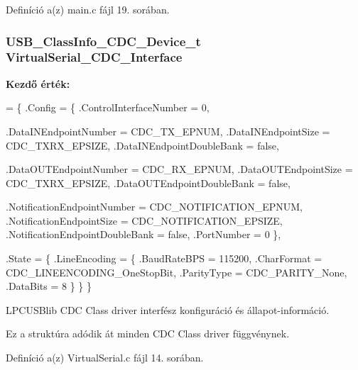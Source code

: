 Definíció a(z) main.\-c fájl 19. sorában.

\subsubsection[{Virtual\-Serial\-\_\-\-C\-D\-C\-\_\-\-Interface}]{\setlength{\rightskip}{0pt plus 5cm}U\-S\-B\-\_\-\-Class\-Info\-\_\-\-C\-D\-C\-\_\-\-Device\-\_\-t Virtual\-Serial\-\_\-\-C\-D\-C\-\_\-\-Interface}\label{_virtual_serial_8c_a6abff48bf476b7a0b5d81012d90058a6}
{\bfseries Kezdő érték\-:}
\begin{DoxyCode}
= \{
    .Config = \{
        .ControlInterfaceNumber         = 0,

        .DataINEndpointNumber           = CDC\_TX\_EPNUM,
        .DataINEndpointSize             = CDC\_TXRX\_EPSIZE,
        .DataINEndpointDoubleBank       = \textcolor{keyword}{false},

        .DataOUTEndpointNumber          = CDC\_RX\_EPNUM,
        .DataOUTEndpointSize            = CDC\_TXRX\_EPSIZE,
        .DataOUTEndpointDoubleBank      = \textcolor{keyword}{false},

        .NotificationEndpointNumber     = CDC\_NOTIFICATION\_EPNUM,
        .NotificationEndpointSize       = CDC\_NOTIFICATION\_EPSIZE,
        .NotificationEndpointDoubleBank = \textcolor{keyword}{false},
        .PortNumber                     = 0
    \},

    .State = \{
        .LineEncoding = \{
                .BaudRateBPS            = 115200,
                .CharFormat             = CDC\_LINEENCODING\_OneStopBit,
                .ParityType             = CDC\_PARITY\_None,
                .DataBits               = 8
        \}
    \}
\}
\end{DoxyCode}


L\-P\-C\-U\-S\-Blib C\-D\-C Class driver interfész konfiguráció és állapot-\/információ. 

Ez a struktúra adódik át minden C\-D\-C Class driver függvénynek. 

Definíció a(z) Virtual\-Serial.\-c fájl 14. sorában.

